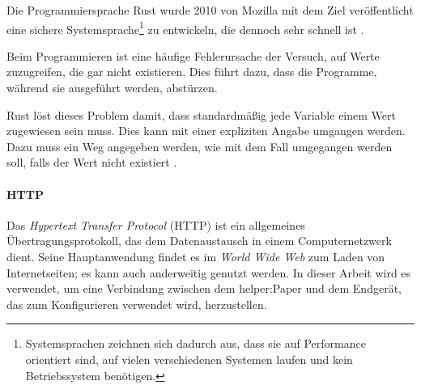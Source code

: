 \documentclass[10pt]{article}
\begin{document}
Die Programmiersprache Rust wurde 2010 von Mozilla mit dem Ziel veröffentlicht eine sichere Systemsprache\noindent\footnote{Systemsprachen zeichnen sich dadurch aus, dass sie auf Performance orientiert sind, auf vielen verschiedenen Systemen laufen und kein Betriebssystem benötigen.} zu entwickeln, die dennoch sehr schnell ist \cite{rust-history}.

Beim Programmieren ist eine häufige Fehlerursache der Versuch, auf Werte zuzugreifen, die gar nicht existieren. Dies führt dazu, dass die Programme, während sie ausgeführt werden, abstürzen.

Rust löst dieses Problem damit, dass standardmäßig jede Variable einem Wert zugewiesen sein muss. Dies kann mit einer expliziten Angabe umgangen werden. Dazu muss ein Weg angegeben werden, wie mit dem Fall umgegangen werden soll, falls der Wert nicht existiert \cite[Kapitel 6.1]{rust-book}.




\paragraph{HTTP}\label{HTTP}
Das \textit{Hypertext Transfer Protocol} (HTTP) ist ein allgemeines Übertragungsprotokoll, das dem Datenaustausch in einem Computernetzwerk dient. Seine Hauptanwendung findet es im \textit{World Wide Web} zum Laden von Internetseiten; es kann auch anderweitig genutzt werden\cite{http-rfc}.
In dieser Arbeit wird es verwendet, um eine Verbindung zwischen dem helper:Paper und dem Endgerät, das zum Konfigurieren verwendet wird, herzustellen.
\end{document}
